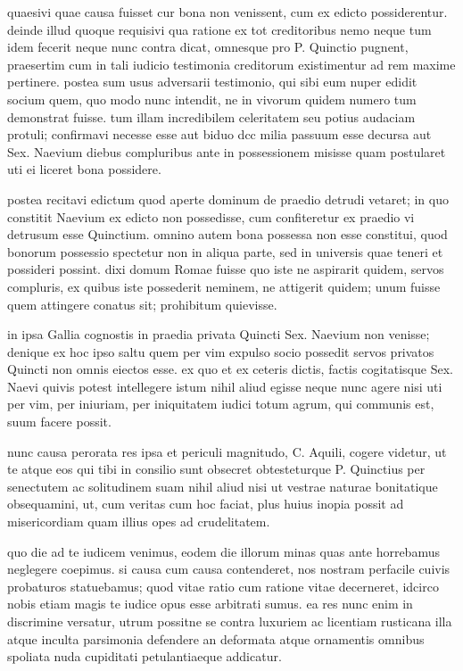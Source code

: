  quaesivi quae causa fuisset cur bona non venissent, cum ex edicto possiderentur. deinde illud quoque requisivi qua ratione ex tot creditoribus nemo neque tum idem fecerit neque nunc contra dicat, omnesque pro P. Quinctio pugnent, praesertim cum in tali iudicio testimonia creditorum existimentur ad rem maxime pertinere. postea sum usus adversarii testimonio, qui sibi eum nuper edidit socium quem, quo modo nunc intendit, ne in vivorum quidem numero tum demonstrat fuisse. tum illam incredibilem celeritatem seu potius audaciam protuli; confirmavi necesse esse aut biduo dcc milia passuum esse decursa aut Sex. Naevium diebus compluribus ante in possessionem misisse quam postularet uti ei liceret bona possidere.

 postea recitavi edictum quod aperte dominum de praedio detrudi vetaret; in quo constitit Naevium ex edicto non possedisse, cum confiteretur ex praedio vi detrusum esse Quinctium. omnino autem bona possessa non esse constitui, quod bonorum possessio spectetur non in aliqua parte, sed in universis quae teneri et possideri possint. dixi domum Romae fuisse quo iste ne aspirarit quidem, servos compluris, ex quibus iste possederit neminem, ne attigerit quidem; unum fuisse quem attingere conatus sit; prohibitum quievisse.

 in ipsa Gallia cognostis in praedia privata Quincti Sex. Naevium non venisse; denique ex hoc ipso saltu quem per vim expulso socio possedit servos privatos Quincti non omnis eiectos esse. ex quo et ex ceteris dictis, factis cogitatisque Sex. Naevi quivis potest intellegere istum nihil aliud egisse neque nunc agere nisi uti per vim, per iniuriam, per iniquitatem iudici totum agrum, qui communis est, suum facere possit.

 nunc causa perorata res ipsa et periculi magnitudo, C. Aquili, cogere videtur, ut te atque eos qui tibi in consilio sunt obsecret obtesteturque P. Quinctius per senectutem ac solitudinem suam nihil aliud nisi ut vestrae naturae bonitatique obsequamini, ut, cum veritas cum hoc faciat, plus huius inopia possit ad misericordiam quam illius opes ad crudelitatem.

 quo die ad te iudicem venimus, eodem die illorum minas quas ante horrebamus neglegere coepimus. si causa cum causa contenderet, nos nostram perfacile cuivis probaturos statuebamus; quod vitae ratio cum ratione vitae decerneret, idcirco nobis etiam magis te iudice opus esse arbitrati sumus. ea res nunc enim in discrimine versatur, utrum possitne se contra luxuriem ac licentiam rusticana illa atque inculta parsimonia defendere an deformata atque ornamentis omnibus spoliata nuda cupiditati petulantiaeque addicatur.


